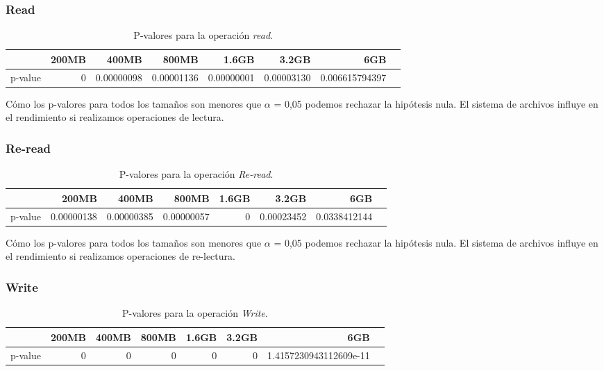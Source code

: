 \subsubsection{Read}
\begin{table}[!htp]\centering
\scriptsize
\begin{tabular}{lrrrrrrr}\toprule
&200MB &400MB &800MB &1.6GB &3.2GB &6GB \\\midrule
p-value &0 &0.00000098 &0.00001136 &0.00000001 &0.00003130 &0.006615794397 \\
\bottomrule
\end{tabular}
\caption{P-valores para la operación \textit{read}.}\label{tab: }
\end{table}

Cómo los p-valores para todos los tamaños son menores que $\alpha$ = 0,05 podemos rechazar la hipótesis nula. El sistema de archivos influye en el rendimiento si realizamos operaciones de lectura. 

\subsubsection{Re-read}
\begin{table}[!htp]\centering
\scriptsize
\begin{tabular}{lrrrrrrr}\toprule
&200MB &400MB &800MB &1.6GB &3.2GB &6GB \\\midrule
p-value &0.00000138 &0.00000385 &0.00000057 &0 &0.00023452 &0.0338412144 \\
\bottomrule
\end{tabular}
\caption{P-valores para la operación \textit{Re-read}.}\label{tab: }
\end{table}

Cómo los p-valores para todos los tamaños son menores que $\alpha$ = 0,05 podemos rechazar la hipótesis nula. El sistema de archivos influye en el rendimiento si realizamos operaciones de re-lectura. 


\subsubsection{Write}
\begin{table}[!htp]\centering
\scriptsize
\begin{tabular}{lrrrrrrr}\toprule
&200MB &400MB &800MB &1.6GB &3.2GB &6GB \\\midrule
p-value &0 &0 &0 &0 &0 &1.4157230943112609e-11 \\
\bottomrule
\end{tabular}
\caption{P-valores para la operación \textit{Write}.}\label{tab: }
\end{table}

